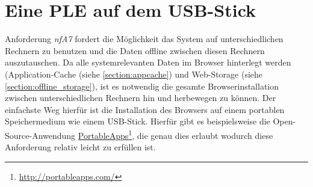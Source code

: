 \section{Eine PLE auf dem USB-Stick}
Anforderung \emph{nfA7} fordert die Möglichkeit das System auf unterschiedlichen Rechnern zu benutzen und die Daten offline zwischen diesen Rechnern auszutauschen. Da alle systemrelevanten Daten im Browser hinterlegt werden (Application-Cache (siehe \ref{section:appcache}) und Web-Storage (siehe \ref{section:offline_storage}), ist es notwendig die gesamte Browserinstallation zwischen unterschiedlichen Rechnern hin und herbewegen zu können. Der einfachste Weg hierfür ist die Installation des Browsers auf einem portablen Speichermedium wie einem USB-Stick. Hierfür gibt es beispielsweise die Open-Source-Anwendung \href{http://portableapps.com/}{PortableApps}\footnote{\url{http://portableapps.com/}}, die genau dies erlaubt wodurch diese Anforderung relativ leicht zu erfüllen ist. 


